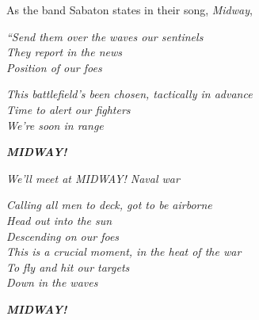 \documentclass[12pt]{article}
\begin{document}
As the band Sabaton states in their song, \textit{Midway}, 

\begin{center} 

\textit{``Send them over the waves our sentinels\\
They report in the news\\
Position of our foes\\}

\end{center}

\begin{center}

\textit{This battlefield's been chosen, tactically in advance\\
Time to alert our fighters\\
We're soon in range\\}

\end{center}


\begin{center}

\textit{\textbf{MIDWAY!}}

\end{center}

\begin{center}

\textit{We'll meet at MIDWAY! Naval war\\}

\end{center}

\begin{center}

\textit{Calling all men to deck, got to be airborne\\
Head out into the sun\\
Descending on our foes\\
This is a crucial moment, in the heat of the war\\
To fly and hit our targets\\
Down in the waves\\}

\end{center}

\begin{center}

\textit{\textbf{MIDWAY!}} 


\end{center}
\end{document}
